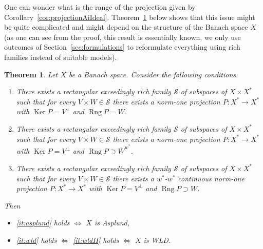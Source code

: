 \documentclass[11pt]{amsart}
\newtheorem{thm}{Theorem}
\theoremstyle{definition}
\theoremstyle{remark}
\newcommand{\SSS}{\mathcal S}
\def \rng {\operatorname{Rng}}
\def \ker {\operatorname{Ker}}
\begin{document}
One can wonder what is the range of the projection given by Corollary~\ref{cor:projectionAiIdeal}. Theorem~\ref{thm:asplundAndWLD} below shows that this issue might be quite complicated and might depend on the structure of the Banach space $X$ (as one can see from the proof, this result is essentially known, we only use outcomes of Section~\ref{sec:formulations} to reformulate everything using rich families instead of suitable models).

\begin{thm}\label{thm:asplundAndWLD}
Let $X$ be a Banach space. Consider the following conditions.
\begin{enumerate}[label=\textnormal{(\roman*)}]
    \item\label{it:asplund} There exists a rectangular exceedingly rich family $\SSS$ of subspaces of $X\times X^*$ such that for every $V\times W\in \SSS$ there exists a norm-one projection $P:X^*\to X^*$ with $\ker P = V^\perp$ and $\rng P = W$.
    \item\label{it:wld} There exists a rectangular exceedingly rich family $\SSS$ of subspaces of $X\times X^*$ such that for every $V\times W\in \SSS$ there exists a norm-one projection $P:X^*\to X^*$ with $\ker P = V^\perp$ and $\rng P \supset \overline{W}^{w^*}$.
    \item\label{it:wldII} There exists a rectangular exceedingly rich family $\SSS$ of subspaces of $X\times X^*$ such that for every $V\times W\in \SSS$ there exists a $w^*$-$w^*$ continuous norm-one projection $P:X^*\to X^*$ with $\ker P = V^\perp$ and $\rng P \supset W$.
\end{enumerate}
Then
\begin{itemize}
    \item \ref{it:asplund} holds $\Leftrightarrow$ $X$ is Asplund,
    \item \ref{it:wld} holds $\Leftrightarrow$ \ref{it:wldII} holds $\Leftrightarrow$ $X$ is WLD.
\end{itemize}
\end{thm}
\end{document}
